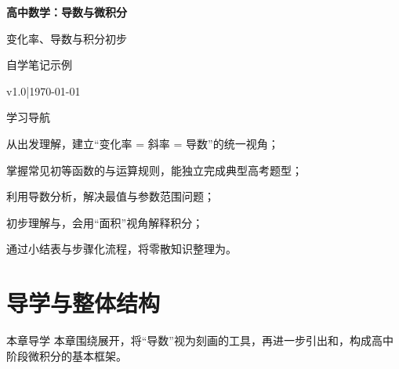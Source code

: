 \documentclass[a4paper,11pt]{ctexart}
\renewcommand{\notetitle}{高中数学：导数与微积分}
\renewcommand{\notesubtitle}{变化率、导数与积分初步}
\renewcommand{\noteauthor}{自学笔记示例}
\renewcommand{\notedate}{\today}
\renewcommand{\noteversion}{v1.0}
\begin{document}
\thispagestyle{empty}
\setcounter{page}{1}

\MathNoteEnablePrint

\noindent
\begin{minipage}[t][0.7\textheight][c]{\textwidth}
  \raggedleft
  \vspace*{\fill}
  {\sffamily\bfseries\Huge\color{accent}\notetitle\par}
  \vspace{0.6em}
  {\Large\color{inkgray}\notesubtitle\par}
  \vspace{0.5em}
  {\large\color{inkgray}\noteauthor\par}
  \vspace{0.4em}
  {\normalsize\color{inkgray}\noteversion\quad|\quad\notedate\par}
  \vspace*{\fill}
\end{minipage}

\begin{center}
\begin{minipage}{0.84\textwidth}
  \textcolor{inkgray}{\sffamily\small 学习导航}\\[0.4em]
  \begin{focuspoints}
    \item 从出发理解，建立“变化率 = 斜率 = 导数”的统一视角；
    \item 掌握常见初等函数的与运算规则，能独立完成典型高考题型；
    \item 利用导数分析，解决最值与参数范围问题；
    \item 初步理解与，会用“面积”视角解释积分；
    \item 通过小结表与步骤化流程，将零散知识整理为。
  \end{focuspoints}
\end{minipage}
\end{center}

\clearpage
\thispagestyle{plain}
\tableofcontents
\newpage
\fi

\section{导学与整体结构}

\begin{summarybox}{本章导学}
本章围绕展开，将“导数”视为刻画的工具，再进一步引出和，构成高中阶段微积分的基本框架。
\end{summarybox}
\end{document}

